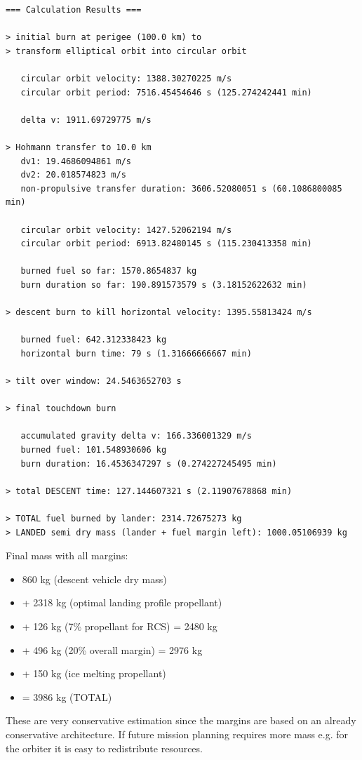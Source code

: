 \begin{lstlisting}[caption={Simulation details from profile (4)}, label=acalcoutput]
=== Calculation Results ===

> initial burn at perigee (100.0 km) to
> transform elliptical orbit into circular orbit

   circular orbit velocity: 1388.30270225 m/s
   circular orbit period: 7516.45454646 s (125.274242441 min)

   delta v: 1911.69729775 m/s

> Hohmann transfer to 10.0 km
   dv1: 19.4686094861 m/s
   dv2: 20.018574823 m/s
   non-propulsive transfer duration: 3606.52080051 s (60.1086800085 min)

   circular orbit velocity: 1427.52062194 m/s
   circular orbit period: 6913.82480145 s (115.230413358 min)

   burned fuel so far: 1570.8654837 kg
   burn duration so far: 190.891573579 s (3.18152622632 min)

> descent burn to kill horizontal velocity: 1395.55813424 m/s

   burned fuel: 642.312338423 kg
   horizontal burn time: 79 s (1.31666666667 min)

> tilt over window: 24.5463652703 s

> final touchdown burn

   accumulated gravity delta v: 166.336001329 m/s
   burned fuel: 101.548930606 kg
   burn duration: 16.4536347297 s (0.274227245495 min)

> total DESCENT time: 127.144607321 s (2.11907678868 min)

> TOTAL fuel burned by lander: 2314.72675273 kg
> LANDED semi dry mass (lander + fuel margin left): 1000.05106939 kg
\end{lstlisting}

Final mass with all margins:
\begin{itemize}  
\item 860 kg (descent vehicle dry mass)
\item + 2318 kg (optimal landing profile propellant)
\item + 126 kg (7\% propellant for RCS) = 2480 kg
\item + 496 kg (20\% overall margin) =  2976 kg 
\item + 150 kg (ice melting propellant)
\item = 3986 kg (TOTAL)
\end{itemize}  
These are very conservative estimation since the margins are based on an already conservative architecture. If future mission planning requires more mass e.g. for the orbiter it is easy to redistribute resources.

